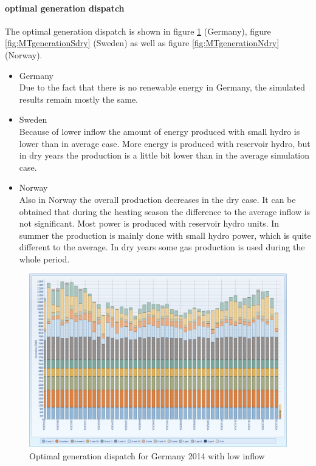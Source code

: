 \documentclass{article}
\begin{document}
\paragraph{optimal generation dispatch\\}
The optimal generation dispatch is shown in figure \ref{fig:MTgenerationGdry} (Germany), figure \ref{fig:MTgenerationSdry} (Sweden) as well as figure \ref{fig:MTgenerationNdry} (Norway).
\begin{itemize}
\item Germany\\
Due to the fact that there is no renewable energy in Germany, the simulated results remain mostly the same. 
\item Sweden\\
Because of lower inflow the amount of energy produced with small hydro is lower than in average case. More energy is produced with reservoir hydro, but in dry years the production is a little bit lower than in the average simulation case.
\item Norway\\
Also in Norway the overall production decreases in the dry case. It can be obtained that during the heating season the difference to the average inflow is not significant. Most power is produced with reservoir hydro units. In summer the production is mainly done with small hydro power, which is quite different to the average. In dry years some gas production is used during the whole period.
\end{itemize}
\begin{figure}[htbp]
\begin{center}
\includegraphics[width=13cm,keepaspectratio=true]{figures/drycase/MTgenerationGdry}
\caption{Optimal generation dispatch for Germany 2014 with low inflow}
\label{fig:MTgenerationGdry}
\end{center}
\end{figure}
\end{document}
